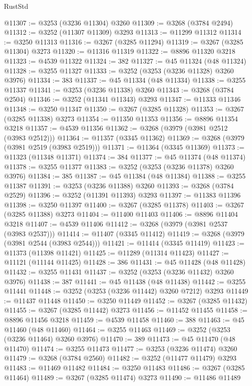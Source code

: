 \begin{lexlean}{RustStd}
\begin{coremodule}
{\begin{coremodule}
{{{{{{{{{{{{{{{{{{{{{{{{{{{{{{{{{{{{{{{@11307 := @3253 (@3236 @11304) @3260
@11309 := @3268 (@3784 @2494)
@11312 := @3252 (@11307 @11309) @3293
@11313 := @11299 @11312
@11314 := @3250 @11313
@11316 := @3267 (@3285 @11294)
@11319 := @3267 (@3285 @11304) @3273
@11320 := @11316 @11319
@11322 := @8896 @11320 @3218
@11323 := @4539 @11322
@11324 := 382
@11327 := @45 @11324 (@48 @11324)
@11328 := @3255 @11327
@11333 := @3252 (@3253 (@3236 @11328) @3260 @3976)
@11334 := 383
@11337 := @45 @11334 (@48 @11334)
@11338 := @3255 @11337
@11341 := @3253 (@3236 @11338) @3260
@11343 := @3268 (@3784 @2504)
@11346 := @3252 (@11341 @11343) @3293
@11347 := @11333 @11346
@11348 := @3250 @11347
@11350 := @3267 (@3285 @11328)
@11353 := @3267 (@3285 @11338) @3273
@11354 := @11350 @11353
@11356 := @8896 @11354 @3218
@11357 := @4539 @11356
@11362 := @3268 (@3979 (@3981 @2512 (@3983 @2512)))
@11364 := @11357 (@3345 @11362)
@11369 := @3268 (@3979 (@3981 @2519 (@3983 @2519)))
@11371 := @11364 (@3345 @11369)
@11373 := @11323 (@11348 @11371)
@11374 := 384
@11377 := @45 @11374 (@48 @11374)
@11378 := @3255 @11377
@11383 := @3252 (@3253 (@3236 @11378) @3260 @3976)
@11384 := 385
@11387 := @45 @11384 (@48 @11384)
@11388 := @3255 @11387
@11391 := @3253 (@3236 @11388) @3260
@11393 := @3268 (@3784 @2529)
@11396 := @3252 (@11391 @11393) @3293
@11397 := @11383 @11396
@11398 := @3250 @11397
@11400 := @3267 (@3285 @11378)
@11403 := @3267 (@3285 @11388) @3273
@11404 := @11400 @11403
@11406 := @8896 @11404 @3218
@11407 := @4539 @11406
@11412 := @3268 (@3979 (@3981 @2537 (@3983 @2537)))
@11414 := @11407 (@3345 @11412)
@11419 := @3268 (@3979 (@3981 @2544 (@3983 @2544)))
@11421 := @11414 (@3345 @11419)
@11423 := @11373 (@11398 @11421)
@11425 := @11289 (@11314 @11423)
@11427 := @11121 (@11144 @11425)
@11428 := 386
@11431 := @45 @11428 (@48 @11428)
@11432 := @3255 @11431
@11437 := @3252 (@3253 (@3236 @11432) @3260 @3976)
@11438 := 387
@11441 := @45 @11438 (@48 @11438)
@11442 := @3255 @11441
@11448 := @3252 (@3253 (@3236 @11442) @3260 @7212) @3293
@11449 := @11437 @11448
@11450 := @3250 @11449
@11452 := @3267 (@3285 @11432)
@11455 := @3267 (@3285 @11442) @3273
@11456 := @11452 @11455
@11458 := @8896 @11456 @3218
@11459 := @4539 @11458
@11460 := 388
@11463 := @45 @11460 (@48 @11460)
@11464 := @3255 @11463
@11469 := @3252 (@3253 (@3236 @11464) @3260 @3976)
@11470 := 389
@11473 := @45 @11470 (@48 @11470)
@11474 := @3255 @11473
@11477 := @3253 (@3236 @11474) @3260
@11479 := @3268 (@3784 @2560)
@11482 := @3252 (@11477 @11479) @3293
@11483 := @11469 @11482
@11484 := @3250 @11483
@11486 := @3267 (@3285 @11464)
@11489 := @3267 (@3285 @11474) @3273
@11490 := @11486 @11489
}}}}}}}}}}}}}}}}}}}}}}}}}}}}}}}}}}}}}}}
\end{coremodule}}
\end{coremodule}
\end{lexlean}
